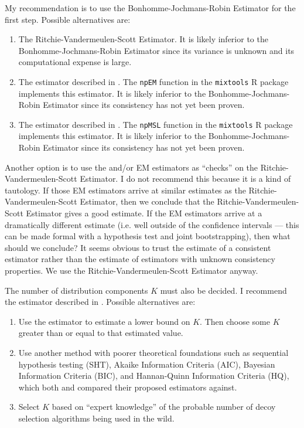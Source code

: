 \documentclass[english]{article}
\begin{document}
My recommendation is to use the Bonhomme-Jochmans-Robin Estimator
for the first step. Possible alternatives are:
\begin{enumerate}
\item The Ritchie-Vandermeulen-Scott Estimator. It is likely inferior to
the Bonhomme-Jochmans-Robin Estimator since its variance is unknown
and its computational expense is large.
\item The estimator described in \cite{Benaglia2009}. The \texttt{npEM}
function in the \texttt{mixtools} R package implements this estimator.
It is likely inferior to the Bonhomme-Jochmans-Robin Estimator since
its consistency has not yet been proven.
\item The estimator described in \cite{Levine2011}. The \texttt{npMSL}
function in the \texttt{mixtools} R package implements this estimator.
It is likely inferior to the Bonhomme-Jochmans-Robin Estimator since
its consistency has not yet been proven.
\end{enumerate}
Another option is to use the \cite{Benaglia2009} and/or \cite{Levine2011}
EM estimators as ``checks'' on the Ritchie-Vandermeulen-Scott Estimator.
I do not recommend this because it is a kind of tautology. If those
EM estimators arrive at similar estimates as the Ritchie-Vandermeulen-Scott
Estimator, then we conclude that the Ritchie-Vandermeulen-Scott Estimator
gives a good estimate. If the EM estimators arrive at a dramatically
different estimate (i.e. well outside of the confidence intervals
--- this can be made formal with a hypothesis test and joint bootstrapping),
then what should we conclude? It seems obvious to trust the estimate
of a consistent estimator rather than the estimate of estimators with
unknown consistency properties. We use the Ritchie-Vandermeulen-Scott
Estimator anyway.

The number of distribution components $K$ must also be decided. I
recommend the estimator described in \cite{KwonMbakop2021}. Possible
alternatives are:
\begin{enumerate}
\item Use the \cite{KasaharaShimotsu2014} estimator to estimate a lower
bound on $K$. Then choose some $K$ greater than or equal to that
estimated value.
\item Use another method with poorer theoretical foundations such as sequential
hypothesis testing (SHT), Akaike Information Criteria (AIC), Bayesian
Information Criteria (BIC), and Hannan-Quinn Information Criteria
(HQ), which both \cite{KasaharaShimotsu2014} and \cite{KwonMbakop2021}
compared their proposed estimators against.
\item Select $K$ based on ``expert knowledge'' of the probable number
of decoy selection algorithms being used in the wild.
\end{enumerate}
\end{document}
